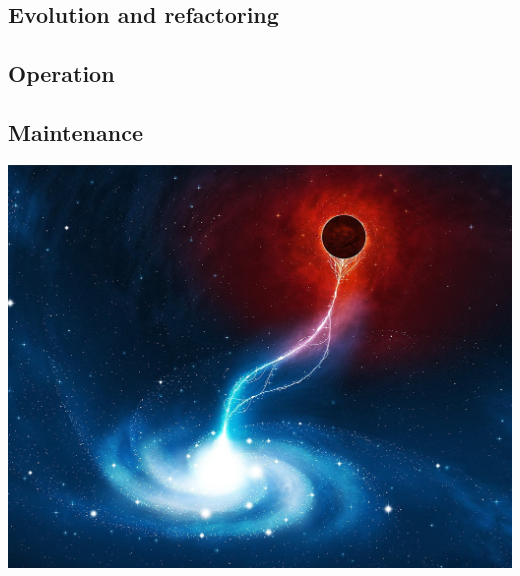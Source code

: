 \documentclass{article}
\begin{document}
\subsection{Evolution and refactoring}
\subsection{Operation}
\subsection{Maintenance}

\newpage
\includegraphics[width=\textwidth]{images/2wall.jpg}
\end{document}
